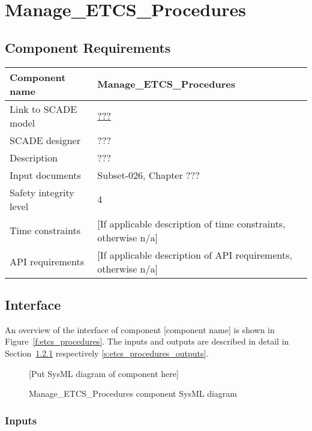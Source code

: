 
\section{Manage\_ETCS\_Procedures}

\subsection{Component Requirements}

\begin{longtable}{p{}p{}}
\toprule
Component name			& Manage\_ETCS\_Procedures \\
\midrule
Link to SCADE model		& {\footnotesize \url{???}} \\
\midrule
SCADE designer			& ??? \\
\midrule
Description				& ??? \\
\midrule
Input documents	& 
Subset-026, Chapter ???\\
\midrule
Safety integrity level		& 4 \\
\midrule
Time constraints		& [If applicable description of time constraints, otherwise n/a] \\
\midrule
API requirements 		& [If applicable description of API requirements, otherwise n/a] \\
\bottomrule
\end{longtable}


\subsection{Interface}

An overview of the interface of component [component name] is shown in Figure~\ref{f:etcs_procedures}. The inputs and outputs are described in detail in Section~\ref{s:etcs_procedures_inputs} respectively \ref{s:etcs_procedures_outputs}.

\begin{figure}
\center
{[Put SysML diagram of component here]}
\caption{Manage\_ETCS\_Procedures component SysML diagram}\label{f:etcs_procedures_interface}
\end{figure}


\subsubsection{Inputs}\label{s:etcs_procedures_inputs}

